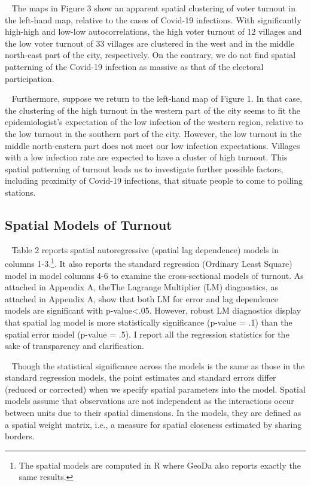 \documentclass[
  12pt,
]{article}
\begin{document}
~ The maps in Figure 3 show an apparent spatial clustering of voter
turnout in the left-hand map, relative to the cases of Covid-19
infections. With significantly high-high and low-low autocorrelations,
the high voter turnout of 12 villages and the low voter turnout of 33
villages are clustered in the west and in the middle north-east part of
the city, respectively. On the contrary, we do not find spatial
patterning of the Covid-19 infection as massive as that of the electoral
participation.

~ Furthermore, suppose we return to the left-hand map of Figure 1. In
that case, the clustering of the high turnout in the western part of the
city seems to fit the epidemiologist's expectation of the low infection
of the western region, relative to the low turnout in the southern part
of the city. However, the low turnout in the middle north-eastern part
does not meet our low infection expectations. Villages with a low
infection rate are expected to have a cluster of high turnout. This
spatial patterning of turnout leads us to investigate further possible
factors, including proximity of Covid-19 infections, that situate people
to come to polling stations.

\hypertarget{spatial-models-of-turnout}{%
\subsection{Spatial Models of Turnout}\label{spatial-models-of-turnout}}

~ Table 2 reports spatial autoregressive (spatial lag dependence) models
in columns 1-3.\footnote{The spatial models are computed in R where
  GeoDa also reports exactly the same results.}. It also reports the
standard regression (Ordinary Least Square) model in model columns 4-6
to examine the cross-sectional models of turnout. As attached in
Appendix A, theThe Lagrange Multiplier (LM) diagnostics, as attached in
Appendix A, show that both LM for error and lag dependence models are
significant with p-value\textless.05. However, robust LM diagnostics
display that spatial lag model is more statistically significance
(p-value = .1) than the spatial error model (p-value = .5). I report all
the regression statistics for the sake of transparency and
clarification.

~ Though the statistical significance across the models is the same as
those in the standard regression models, the point estimates and
standard errors differ (reduced or corrected) when we specify spatial
parameters into the model. Spatial models assume that observations are
not independent as the interactions occur between units due to their
spatial dimensions. In the models, they are defined as a spatial weight
matrix, i.e., a measure for spatial closeness estimated by sharing
borders.
\end{document}
